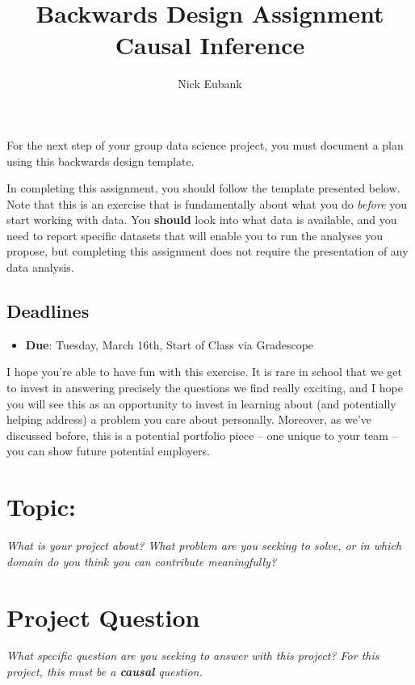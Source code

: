 \documentclass[12pt]{article}
\title{Backwards Design Assignment \\ Causal Inference}
\author{Nick Eubank}
\begin{document}
\maketitle

For the next step of your group data science project, you must document a plan using this backwards design template.

In completing this assignment, you should follow the template presented below. Note that this is an exercise that is fundamentally about what you do \emph{before} you start working with data. You \textbf{should} look into what data is available, and you need to report specific datasets that will enable you to run the analyses you propose, but completing this assignment does not require the presentation of any data analysis.

\subsection*{Deadlines}

\begin{itemize}
  \item \textbf{Due}: Tuesday, March 16th, Start of Class via Gradescope
\end{itemize}

I hope you're able to have fun with this exercise. It is rare in school that we get to invest in answering precisely the questions we find really exciting, and I hope you will see this as an opportunity to invest in learning about (and potentially helping address) a problem you care about personally. Moreover, as we've discussed before, this is a potential portfolio piece -- one unique to your team -- you can show future potential employers.

\section{Topic:}
\emph{What is your project about? What problem are you seeking to solve, or in which domain do you think you can contribute meaningfully?}
\vspace*{1cm}\\

\section{Project Question}
\emph{What specific question are you seeking to answer with this project? For this project, this must be a \textbf{causal} question.}
\vspace*{1cm}\\
\end{document}
